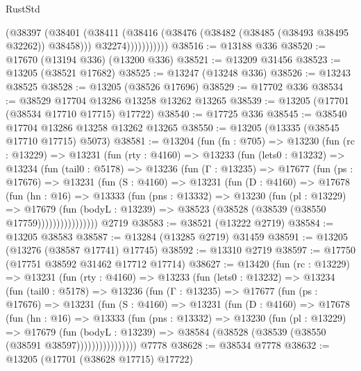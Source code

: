 \begin{lexlean}{RustStd}
\begin{coremodule}
                    (@38397
                      (@38401
                        (@38411
                          (@38416 (@38476 (@38482 (@38485 (@38493 @38495 @32262)) @38458)))
                          @32274)))))))))))
@38516 := @13188 @336
@38520 := @17670 (@13194 @336) (@13200 @336)
@38521 := @13209 @31456
@38523 := @13205 (@38521 @17682)
@38525 := @13247 (@13248 @336)
@38526 := @13243 @38525
@38528 := @13205 (@38526 @17696)
@38529 := @17702 @336
@38534 := @38529 @17704 @13286 @13258 @13262 @13265
@38539 := @13205 (@17701 (@38534 @17710 @17715) @17722)
@38540 := @17725 @336
@38545 := @38540 @17704 @13286 @13258 @13262 @13265
@38550 := @13205 (@13335 (@38545 @17710 @17715) @5073)
@38581 := @13204
    (fun (fn : @705) =>
    @13230
      (fun (rc : @13229) =>
      @13231
        (fun (rty : @4160) =>
        @13233
          (fun (lets0 : @13232) =>
          @13234
            (fun (tail0 : @5178) =>
            @13236
              (fun (Γ : @13235) =>
              @17677
                (fun (ps : @17676) =>
                @13231
                  (fun (S : @4160) =>
                  @13231
                    (fun (D : @4160) =>
                    @17678
                      (fun (hn : @16) =>
                      @13333
                        (fun (pns : @13332) =>
                        @13230
                          (fun (pl : @13229) =>
                          @17679
                            (fun (bodyL : @13239) =>
                            @38523 (@38528 (@38539 (@38550 @17759))))))))))))))))
    @2719
@38583 := @38521 (@13222 @2719)
@38584 := @13205 @38583
@38587 := @13284 (@13285 @2719) @31459
@38591 := @13205 (@13276 (@38587 @17741) @17745)
@38592 := @13310 @2719
@38597 := @17750 (@17751 @38592 @31462 @17712 @17714)
@38627 := @13420
    (fun (rc : @13229) =>
    @13231
      (fun (rty : @4160) =>
      @13233
        (fun (lets0 : @13232) =>
        @13234
          (fun (tail0 : @5178) =>
          @13236
            (fun (Γ : @13235) =>
            @17677
              (fun (ps : @17676) =>
              @13231
                (fun (S : @4160) =>
                @13231
                  (fun (D : @4160) =>
                  @17678
                    (fun (hn : @16) =>
                    @13333
                      (fun (pns : @13332) =>
                      @13230
                        (fun (pl : @13229) =>
                        @17679
                          (fun (bodyL : @13239) =>
                          @38584 (@38528 (@38539 (@38550 (@38591 @38597))))))))))))))))
    @7778
@38628 := @38534 @7778
@38632 := @13205 (@17701 (@38628 @17715) @17722)

\end{coremodule}
\end{lexlean}
